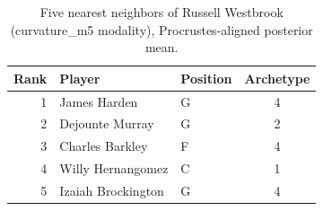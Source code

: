 \begin{table}[htbp]
  \centering\small
  \begin{tabular}{rllc}
    \toprule
    Rank & Player & Position & Archetype \\
    \midrule
    1 & James Harden & G & 4 \\
    2 & Dejounte Murray & G & 2 \\
    3 & Charles Barkley & F & 4 \\
    4 & Willy Hernangomez & C & 1 \\
    5 & Izaiah Brockington & G & 4 \\
    \bottomrule
  \end{tabular}
  \caption{Five nearest neighbors of Russell Westbrook (curvature_m5 modality), Procrustes-aligned posterior mean.}
  \label{tab:Russell_Westbrook_neighbors_curvature_m5}
\end{table}

